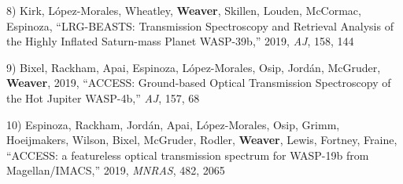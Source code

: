 \begin{cventries}
{8) Kirk, L\'opez-Morales, Wheatley, \textbf{Weaver},
Skillen, Louden, McCormac, Espinoza,
``LRG-BEASTS: Transmission Spectroscopy and Retrieval Analysis of the Highly Inflated Saturn-mass Planet WASP-39b,'' 2019, \textit{AJ}, 158, 144

9) Bixel, Rackham, Apai, Espinoza, L\'opez-Morales,
Osip, Jord\'an, McGruder, \textbf{Weaver}, 
2019, ``ACCESS: Ground-based Optical Transmission Spectroscopy of the Hot Jupiter WASP-4b,'' \textit{AJ}, 157, 68

10) Espinoza, Rackham, Jord\'an, Apai, L\'opez-Morales, 
Osip, Grimm, Hoeijmakers, Wilson, Bixel, McGruder, 
Rodler, \textbf{Weaver}, Lewis, Fortney, Fraine, 
``ACCESS: a featureless optical transmission spectrum for WASP-19b from Magellan/IMACS,'' 2019, 
\textit{MNRAS}, 482, 2065
}
\end{cventries}